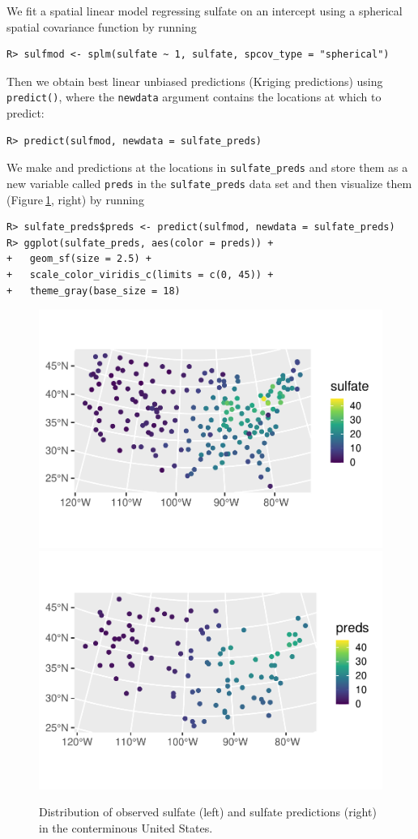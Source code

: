 \documentclass{article}
\begin{document}
We fit a spatial linear model regressing sulfate on an intercept using a
spherical spatial covariance function by running

\begin{verbatim}
R> sulfmod <- splm(sulfate ~ 1, sulfate, spcov_type = "spherical")
\end{verbatim}

Then we obtain best linear unbiased predictions (Kriging predictions)
using \texttt{predict()}, where the \texttt{newdata} argument contains
the locations at which to predict:

\begin{verbatim}
R> predict(sulfmod, newdata = sulfate_preds)
\end{verbatim}

We make and predictions at the locations in \texttt{sulfate\_preds} and
store them as a new variable called \texttt{preds} in the
\texttt{sulfate\_preds} data set and then visualize them
(Figure\(~\)\ref{fig:sulfate}, right) by running

\begin{verbatim}
R> sulfate_preds$preds <- predict(sulfmod, newdata = sulfate_preds)
R> ggplot(sulfate_preds, aes(color = preds)) +
+   geom_sf(size = 2.5) +
+   scale_color_viridis_c(limits = c(0, 45)) +
+   theme_gray(base_size = 18)
\end{verbatim}

\begin{figure}

{\centering \includegraphics[width=0.49\linewidth]{preprint_files/figure-latex/sulfate-1} \includegraphics[width=0.49\linewidth]{preprint_files/figure-latex/sulfate-2} 

}

\caption{Distribution of observed sulfate (left) and sulfate predictions (right) in the conterminous United States.}\label{fig:sulfate}
\end{figure}
\end{document}
